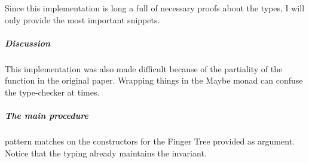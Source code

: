 \documentclass[12pt,twoside,notitlepage]{report}
\begin{document}
Since this implementation is long a full of necessary proofs about the types, I will only provide the most important snippets.

\subparagraph{Discussion} This implementation was also made difficult because of the partiality of the function in the original paper. Wrapping things in the Maybe monad can confuse the type-checker at times.

\subparagraph{The main procedure} pattern matches on the constructors for the Finger Tree provided as argument. Notice that the typing already maintains the invariant.

\begin{code}
\\
\>[0]\<[2]%
\>[2] \AgdaSymbol{:}  \AgdaSymbol{\{}\AgdaSymbol{\}} \AgdaSymbol{\{} \AgdaSymbol{:}  \AgdaSymbol{\}} \AgdaSymbol{\{} \AgdaSymbol{:}  \AgdaSymbol{\}}\<%
\\
\>[2]\<[14]%
\>[14]  \AgdaSymbol{:}   \<%
\\
\>[2]\<[14]%
\>[14]  \AgdaSymbol{:}    \<%
\\
\>[2]\<[14]%
\>[14]\AgdaSymbol{\{} \AgdaSymbol{:} \AgdaSymbol{\}} \<%
\\
\>[2]\<[14]%
\>[14] \AgdaSymbol{(} \AgdaSymbol{:}   \AgdaSymbol{)}  \AgdaSymbol{(} \AgdaSymbol{:} \AgdaSymbol{)} \<%
\\
\>[2]\<[14]%
\>[14] \AgdaSymbol{(} \AgdaSymbol{:}    \AgdaSymbol{\{}\AgdaSymbol{\})} \<%
\\
\>[2]\<[14]%
\>[14]  \AgdaSymbol{(}   \AgdaSymbol{\{}\AgdaSymbol{\})}\<%
\\
\>[0]\<[2]%
\>[2]   \<%

\end{code}
\end{document}
